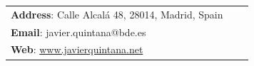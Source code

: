 \documentclass[letterpaper, 11pt]{article}
\begin{document}
\vspace{0.5cm}
\begin{center}
\begin{tabular}{lll}
\textbf{Address}: Calle Alcalá 48, 28014, Madrid, Spain       \\
\textbf{Email}: javier.quintana@bde.es  \\
\textbf{Web}: \href{https://www.javierquintana.net}{www.javierquintana.net}
\end{tabular}
\end{center}
\setlength{\tabcolsep}{8pt}
\end{document}
